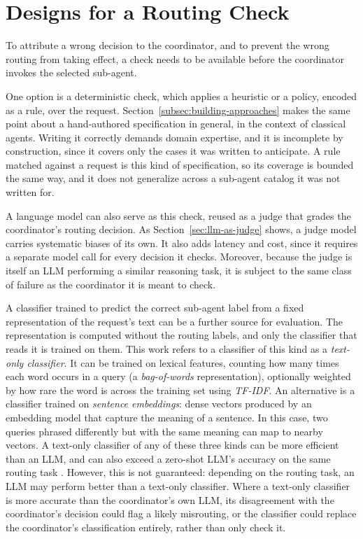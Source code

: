 \section{Designs for a Routing Check}
\label{sec:routing-check-designs}

To attribute a wrong decision to the coordinator, and to prevent the wrong routing from taking effect, a check needs to be available before the coordinator invokes the selected sub-agent.

One option is a deterministic check, which applies a heuristic or a policy, encoded as a rule, over the request. Section~\ref{subsec:building-approaches} makes the same point about a hand-authored specification in general, in the context of classical agents. Writing it correctly demands domain expertise, and it is incomplete by construction, since it covers only the cases it was written to anticipate. A rule matched against a request is this kind of specification, so its coverage is bounded the same way, and it does not generalize across a sub-agent catalog it was not written for.

A language model can also serve as this check, reused as a judge that grades the coordinator's routing decision. As Section~\ref{sec:llm-as-judge} shows, a judge model carries systematic biases of its own. It also adds latency and cost, since it requires a separate model call for every decision it checks. Moreover, because the judge is itself an LLM performing a similar reasoning task, it is subject to the same class of failure as the coordinator it is meant to check.

A classifier trained to predict the correct sub-agent label from a fixed representation of the request's text can be a further source for evaluation. The representation is computed without the routing labels, and only the classifier that reads it is trained on them. This work refers to a classifier of this kind as a \emph{text-only classifier}. It can be trained on lexical features, counting how many times each word occurs in a query (a \emph{bag-of-words} representation), optionally weighted by how rare the word is across the training set using \emph{TF-IDF}. An alternative is a classifier trained on \emph{sentence embeddings}: dense vectors produced by an embedding model that capture the meaning of a sentence. In this case, two queries phrased differently but with the same meaning can map to nearby vectors. A text-only classifier of any of these three kinds can be more efficient than an LLM, and can also exceed a zero-shot LLM's accuracy on the same routing task \cite{balaMultiAgentRoutingSetValued2026}. However, this is not guaranteed: depending on the routing task, an LLM may perform better than a text-only classifier. Where a text-only classifier is more accurate than the coordinator's own LLM, its disagreement with the coordinator's decision could flag a likely misrouting, or the classifier could replace the coordinator's classification entirely, rather than only check it.

